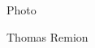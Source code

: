 
\begin{minipage}[c]{2cm}
Photo
\end{minipage}
\begin{minipage}[c]{10cm}
Thomas Remion
\end{minipage}
